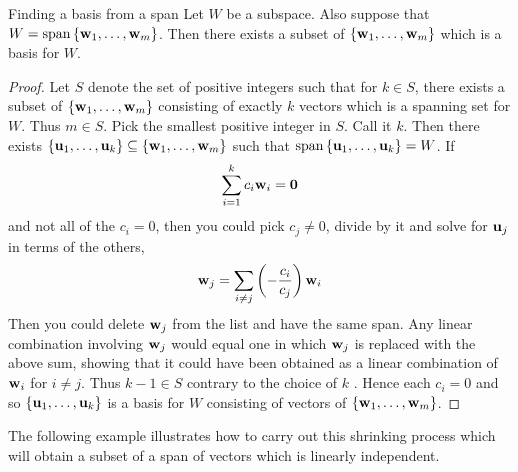 \begin{theorem}{Finding a basis from a span}{}
  Let $W$ be a subspace. Also suppose that
  $W=\sspan\set{\vect{w} _{1},\ldots ,\vect{w}_{m}}$. Then there
  exists a subset of $\left\{ \mbox{\bf w}_{1},\ldots ,\mbox{\bf w}_{m}\right\} $ which
  is a basis for $W$.
\end{theorem}

\begin{proof}
  Let $S$ denote the set of positive integers such that for $ k\in S$,
  there exists a subset of $\left\{\mbox{\bf w}_{1},\ldots ,\mbox{\bf w}_{m}\right\} $
  consisting of exactly $k$ vectors which is a spanning set for
  $W$. Thus $m\in S$. Pick the smallest positive integer in $S$. Call
  it $k$. Then there exists
  $\left\{\mbox{\bf u}_{1},\ldots , \mbox{\bf u}_{k}\right\} \subseteq
  \left\{\mbox{\bf w}_{1},\ldots ,\mbox{\bf w} _{m}\right\} $ such that
  $\sspan\set{\vect{u}_{1},\ldots ,\vect{u} _{k}} =W$. If
  \begin{equation*}
    \sum_{i=1}^{k}c_{i}\mbox{\bf w}_{i}=\mbox{\bf 0}
  \end{equation*}
  and not all of the $c_{i}=0$, then you could pick $c_{j}\neq 0$,
  divide by it and solve for $\mbox{\bf u}_{j}$ in terms of the others,
  \begin{equation*}
    \mbox{\bf w}_{j}=\sum_{i\neq j}\left(-\frac{c_{i}}{c_{j}}\right) \mbox{\bf w}_{i}
  \end{equation*}
  Then you could delete $\mbox{\bf w}_{j}$ from the list and have the same
  span. Any linear combination involving $\mbox{\bf w}_{j}$ would equal
  one in which $\mbox{\bf w}_{j}$ is replaced with the above sum, showing
  that it could have been obtained as a linear combination of
  $\mbox{\bf w}_{i}$ for $i\neq j$. Thus $k-1\in S$ contrary to the choice
  of $k$ . Hence each $c_{i}=0$ and so
  $\left\{\mbox{\bf u}_{1},\ldots ,\mbox{\bf u} _{k}\right\} $ is a basis for $W$
  consisting of vectors of $\left\{\mbox{\bf w} _{1},\ldots ,\mbox{\bf w}_{m}\right\}$.
\end{proof}

The following example illustrates how to carry out this shrinking
process which will obtain a subset of a span of vectors which is
linearly independent.

